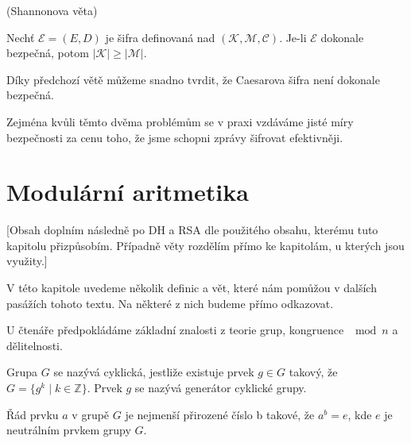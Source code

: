 \documentclass[
  program=infoi,
  biblatex,
  figures=false,
  glossaries,
  index
]{kidiplom}
\begin{document}
    \begin{theorem}
        (Shannonova věta)

        Nechť $\mathcal{E}  = (E, D)$ je šifra definovaná nad $(\mathcal{K},\mathcal{M},\mathcal{C})$.
        Je-li $\mathcal{E}$ dokonale bezpečná, potom $|\mathcal{K}| \geq |\mathcal{M}|$.
    \end{theorem}


    \medskip

    Díky předchozí větě můžeme snadno tvrdit, že Caesarova šifra není dokonale bezpečná.

    Zejména kvůli těmto dvěma problémům se v praxi vzdáváme jisté míry bezpečnosti za cenu toho, že jsme schopni zprávy šifrovat efektivněji.


\section{Modulární aritmetika}\label{sec:modular-arithmetic}

    [Obsah doplním následně po DH a RSA dle použitého obsahu, kterému tuto kapitolu přizpůsobím.
    Případně věty rozdělím přímo ke kapitolám, u kterých jsou využity.]

    V této kapitole uvedeme několik definic a vět, které nám pomůžou v dalších pasážích tohoto textu.
    Na některé z nich budeme přímo odkazovat.
    
    U čtenáře předpokládáme základní znalosti z teorie grup, kongruence $\mod{n}$ a dělitelnosti.

    




    \begin{definition}
        Grupa $G$ se nazývá cyklická, jestliže existuje prvek $g \in G$ takový, že $G =\{g^k \mid k \in \mathbb{Z}\}$.
        Prvek $g$ se nazývá generátor cyklické grupy.
    \end{definition}

    \begin{definition}
        Řád prvku $a$ v grupě $G$ je nejmenší přirozené číslo b takové, že $a^b = e$, kde $e$ je neutrálním prvkem grupy $G$.
    \end{definition}
\end{document}
